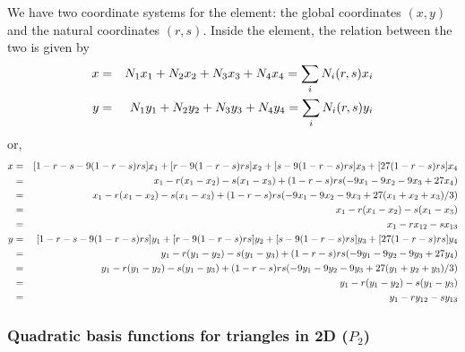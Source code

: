 We have two coordinate systems for the element: the global coordinates $(x,y)$ 
and the natural coordinates $(r,s)$. Inside the element, the relation between the two is given by
\begin{eqnarray}
x &=& N_1 x_1 + N_2 x_2 + N_3 x_3 + N_4 x_4 = \sum_i N_i(r,s) x_i\nonumber\\
y &=& N_1 y_1 + N_2 y_2 + N_3 y_3 + N_4 y_4 = \sum_i N_i(r,s) y_i
\end{eqnarray}
or,
\begin{eqnarray}
x &=& [ 1-r-s-9(1-r-s)rs] x_1 + [r-9(1-r-s)rs] x_2 + [s-9(1-r-s)rs] x_3 + [27(1-r-s)rs] x_4 \nonumber\\
&=& x_1 -r (x_1-x_2) -s (x_1-x_3) + (1-r-s)rs (-9 x_1 - 9 x_2  -9 x_3 +27 x_4)  \nonumber\\
&=& x_1 -r (x_1-x_2) -s (x_1-x_3) + (1-r-s)rs (-9 x_1 - 9 x_2  -9 x_3 +27 (x_1+x_2+x_3)/3) \nonumber\\ 
&=& x_1 -r (x_1-x_2) -s (x_1-x_3) \nonumber\\ 
&=& x_1 -r x_{12} -s x_{13} \nonumber\\ 
y &=& [ 1-r-s-9(1-r-s)rs] y_1 + [r-9(1-r-s)rs] y_2 + [s-9(1-r-s)rs] y_3 + [27(1-r-s)rs] y_4 \nonumber\\
&=& y_1 -r (y_1-y_2) -s (y_1-y_3) + (1-r-s)rs (-9 y_1 - 9 y_2  -9 y_3 +27 y_4)  \nonumber\\
&=& y_1 -r (y_1-y_2) -s (y_1-y_3) + (1-r-s)rs (-9 y_1 - 9 y_2  -9 y_3 +27 (y_1+y_2+y_3)/3) \nonumber\\ 
&=& y_1 -r (y_1-y_2) -s (y_1-y_3) \nonumber \\
&=& y_1 -r y_{12} -s y_{13} \nonumber 
\end{eqnarray}




























\subsubsection{Quadratic basis functions for triangles in 2D ($P_2$)}

